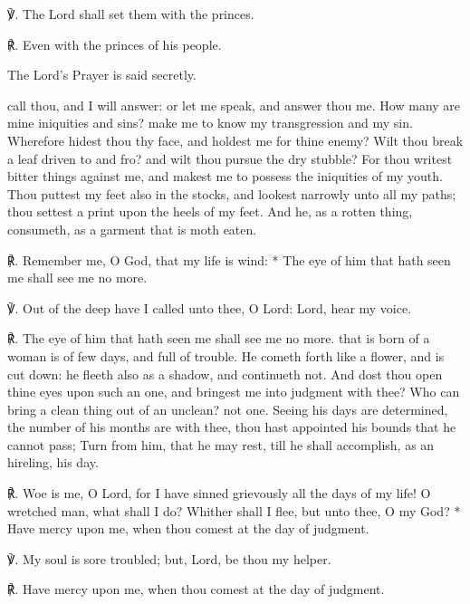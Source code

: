 \vspace{0.5\baselineskip}
℣. The Lord shall set them with the princes.\par
℟. Even with the princes of his people.\par
\begin{rubric}
    {The Lord's Prayer is said secretly.}
\end{rubric}
 call thou, and I will answer: or let me speak, and answer thou me. How many are mine iniquities and sins? make me to know my transgression and my sin. Wherefore hidest thou thy face, and holdest me for thine enemy? Wilt thou break a leaf driven to and fro? and wilt thou pursue the dry stubble? For thou writest bitter things against me, and makest me to possess the iniquities of my youth. Thou puttest my feet also in the stocks, and lookest narrowly unto all my paths; thou settest a print upon the heels of my feet. And he, as a rotten thing, consumeth, as a garment that is moth eaten.\par
℟. Remember me, {\dag} O God, that my life is wind: * The eye of him that hath seen me shall see me no more.\par
℣. Out of the deep have I called unto thee, O Lord: Lord, hear my voice.\par
℟. The eye of him that hath seen me shall see me no more.
 that is born of a woman is of few days, and full of trouble. He cometh forth like a flower, and is cut down: he fleeth also as a shadow, and continueth not. And dost thou open thine eyes upon such an one, and bringest me into judgment with thee? Who can bring a clean thing out of an unclean? not one. Seeing his days are determined, the number of his months are with thee, thou hast appointed his bounds that he cannot pass; Turn from him, that he may rest, till he shall accomplish, as an hireling, his day.\par
℟. Woe is me, {\dag} O Lord, for I have sinned grievously all the days of my life! O wretched man, what shall I do? Whither shall I flee, but unto thee, O my God? * Have mercy upon me, when thou comest at the day of judgment.\par
℣. My soul is sore troubled; but, Lord, be thou my helper.\par
℟. Have mercy upon me, when thou comest at the day of judgment.
